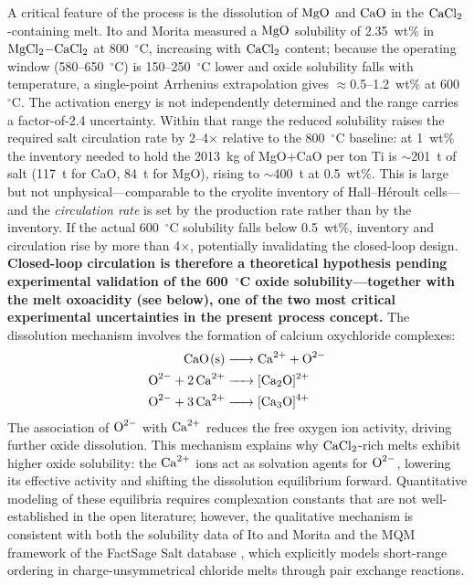\documentclass[11pt]{article}
\begin{document}
A critical feature of the process is the dissolution of $\ce{MgO}$ and $\ce{CaO}$ in the $\ce{CaCl2}$-containing melt. Ito and Morita \cite{morita2004} measured a $\ce{MgO}$ solubility of 2.35~wt\% in $\ce{MgCl2-CaCl2}$ at 800~$^{\circ}$C, increasing with $\ce{CaCl2}$ content; because the operating window (580--650~$^{\circ}$C) is 150--250~$^{\circ}$C lower and oxide solubility falls with temperature, a single-point Arrhenius extrapolation gives $\approx$0.5--1.2~wt\% at 600~$^{\circ}$C. The activation energy is not independently determined and the range carries a factor-of-2.4 uncertainty. Within that range the reduced solubility raises the required salt circulation rate by 2--4$\times$ relative to the 800~$^{\circ}$C baseline: at 1~wt\% the inventory needed to hold the 2013~kg of MgO+CaO per ton Ti is $\sim$201~t of salt (117~t for CaO, 84~t for MgO), rising to $\sim$400~t at 0.5~wt\%. This is large but not unphysical---comparable to the cryolite inventory of Hall--H\'eroult cells---and the \emph{circulation rate} is set by the production rate rather than by the inventory. If the actual 600~$^{\circ}$C solubility falls below 0.5~wt\%, inventory and circulation rise by more than 4$\times$, potentially invalidating the closed-loop design. \textbf{Closed-loop circulation is therefore a theoretical hypothesis pending experimental validation of the 600~$^{\circ}$C oxide solubility---together with the melt oxoacidity (see below), one of the two most critical experimental uncertainties in the present process concept.} The dissolution mechanism involves the formation of calcium oxychloride complexes:
\begin{align}
\ce{CaO(s) &-> Ca^{2+} + O^{2-}} \label{eq:diss1} \\
\ce{O^{2-} + 2Ca^{2+} &-> [Ca2O]^{2+}} \label{eq:diss2} \\
\ce{O^{2-} + 3Ca^{2+} &-> [Ca3O]^{4+}} \label{eq:diss3}
\end{align}
The association of $\ce{O^{2-}}$ with $\ce{Ca^{2+}}$ reduces the free oxygen ion activity, driving further oxide dissolution. This mechanism explains why $\ce{CaCl2}$-rich melts exhibit higher oxide solubility: the $\ce{Ca^{2+}}$ ions act as solvation agents for $\ce{O^{2-}}$, lowering its effective activity and shifting the dissolution equilibrium forward. Quantitative modeling of these equilibria requires complexation constants that are not well-established in the open literature; however, the qualitative mechanism is consistent with both the solubility data of Ito and Morita \cite{morita2004} and the MQM framework of the FactSage Salt database \cite{pelton2000mqm}, which explicitly models short-range ordering in charge-unsymmetrical chloride melts through pair exchange reactions.
\end{document}

